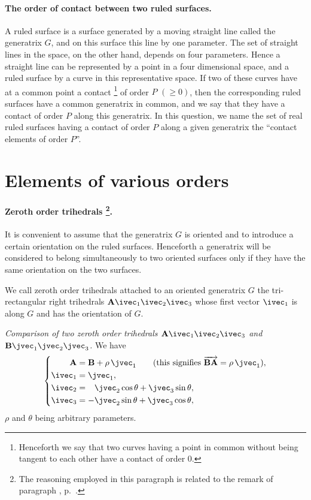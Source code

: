 \paragraph{The order of contact between two ruled surfaces.}
\label{sec:43}
A ruled surface is a surface generated by a moving straight line called the generatrix $G$, and on this surface this line by one parameter. The set of straight lines in the space, on the other hand, depends on four parameters. Hence a straight line can be represented by a point in a four dimensional space, and a ruled surface by a curve in this representative space. If two of these curves have at a common point a contact \footnote{Henceforth we say that two curves having a point in common without being tangent to each other have a contact of order $0$.} of order $P$ $(\ge 0)$, then the corresponding ruled surfaces have a common generatrix in common, and we say that they have a contact of order $P$ along this generatrix. In this question, we name the set of real ruled surfaces having a contact of order $P$ along a given generatrix the ``contact elements of order $P$''.


\section{Elements of various orders}
\label{sec:elem-vari-orders}

\paragraph[{Zeroth order trihedrals.} ]{Zeroth order trihedrals \footnote{The reasoning employed in this paragraph is related to the remark of paragraph , p.~\pageref{sec:27}.}.} 
\label{sec:44}
It is convenient to assume that the generatrix $G$ is oriented and to introduce a certain orientation on the ruled surfaces. Henceforth a generatrix will be considered to belong simultaneously to two oriented surfaces only if they have the same orientation on the two surfaces.

We call zeroth order trihedrals attached to an oriented generatrix $G$ the tri-rectangular right trihedrals $\mathbf{A}\ivec_{1}\ivec_{2}\ivec_{3}$ whose first vector $\ivec_{1}$ is along $G$ and has the orientation of $G$.

\somespace

\emph{Comparison of two zeroth order trihedrals $\mathbf{A}\ivec_{1}\ivec_{2}\ivec_{3}$ and $\mathbf{B}\jvec_{1}\jvec_{2}\jvec_{3}$.} We have
\begin{equation}
  \label{eq:3.1}
  \left\{
    \begin{aligned}
      \mathbf{A}&=\mathbf{B}+\rho\,\jvec_{1}\qquad\text{(this signifies $\overrightarrow{\mathbf{BA}}=\rho\,\jvec_{1}$)},\\
      \ivec_{1}&=\jvec_{1},\\
      \ivec_{2}&=\phantom{+}\jvec_{2}\cos\theta+\jvec_{3}\sin\theta,\\
      \ivec_{3}&=-\jvec_{2}\sin\theta+\jvec_{3}\cos\theta,
    \end{aligned}
  \right.
\end{equation}
$\rho$ and $\theta$ being arbitrary parameters.

